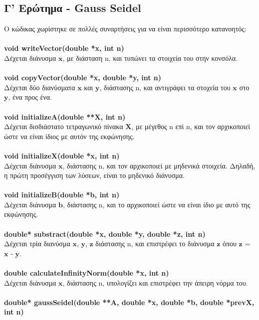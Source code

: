 \documentclass[a4paper, 14pt]{article}   %
\begin{document}
\subsection*{Γ' Ερώτημα - Gauss Seidel}  %
Ο κώδικας χωρίστηκε σε πολλές συναρτήσεις για να είναι περισσότερο κατανοητός:\\\\
\textbf{void writeVector(double *x, int n)}\\
	Δέχεται διάνυσμα $\mathbf{x}$, με διάσταση n, και τυπώνει τα στοιχεία του στην κονσόλα.\\\\
\textbf{void copyVector(double *x, double *y, int n)}\\
	Δέχεται δύο διανύσματα $\mathbf{x}$ και $\mathbf{y}$, διάστασης n, και αντιγράφει τα στοχεία του $\mathbf{x}$ στο $\mathbf{y}$, ένα προς ένα.\\\\
\textbf{void initializeA(double **X, int n)}\\
	Δέχεται δισδιάστατο τετραγωνικό πίνακα $\mathbf{X}$, με μέγεθος n επί n, και τον αρχικοποιεί ώστε να είναι ίδιος με αυτόν της εκφώνησης.\\\\
\textbf{void initializeX(double *x, int n)}\\
	Δέχεται διάνυσμα $\mathbf{x}$, διάστασης n, και τον αρχικοποιεί με μηδενικά στοιχεία. Δηλαδή, η πρώτη προσέγγιση των λύσεων, είναι το μηδενικό διάνυσμα.\\\\
\textbf{void initializeB(double *b, int n)}\\
	Δέχεται διάνυσμα $\mathbf{b}$, διάστασης n, και το αρχικοποιεί ώστε να είναι ίδιο με αυτό της εκφώνησης.\\\\
\textbf{double* substract(double *x, double *y, double *z, int n)}\\
	Δέχεται τρία διανύσμα $\mathbf{x}$, $\mathbf{y}$, $\mathbf{z}$ διάστασης n, και επιστρέφει το διάνυσμα $\mathbf{z}$ όπου $\mathbf{z}$ = $\mathbf{x}$ - $\mathbf{y}$.\\\\
\textbf{double calculateInfinityNorm(double *x, int n)}\\
	Δέχεται διάνυσμα $\mathbf{x}$, διάστασης n, υπολογίζει και επιστρέφει την άπειρη νόρμα του.\\\\
\textbf{double* gaussSeidel(double **A, double *x, double *b, double *prevX, int n)}\\
\end{document}
